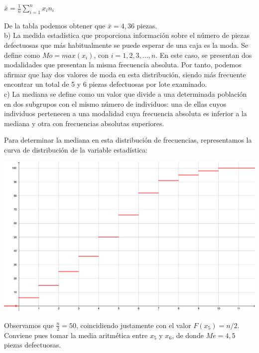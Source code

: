 \begin{center}
	$\bar{x} = \frac{1}{n} \sum_{i=1}^{n}x_{i} n_{i}$ 
\end{center}

De la tabla podemos obtener que $\bar{x} = 4,36$ piezas. \\

b) La medida estadística que proporciona información sobre el número de piezas defectuosas que más habitualmente se puede esperar de una caja es la moda. Se define como $Mo = max(x_{i})$, con $i=1,2,3,...,n$. En este caso, se presentan dos modalidades que presentan la misma frecuencia absoluta. Por tanto, podemos afirmar que hay dos valores de moda en esta distribución, siendo más frecuente encontrar un total de 5 y 6 piezas defectuosas por lote examinado. \\

c) La mediana se define como un valor que divide a una determinada población en dos subgrupos con el mismo número de individuos: una de ellas cuyos individuos pertenecen a una modalidad cuya frecuencia absoluta es inferior a la mediana y otra con frecuencias absolutas superiores.

Para determinar la mediana en esta distribución de frecuencias, representamos la curva de distribución de la variable estadística: 

\begin{center}
	\includegraphics[scale=.35]{ejercicio-4-grafica.pdf}
\end{center}

Observamos que $\frac{n}{2} = 50$, coincidiendo justamente con el valor $F(x_{5}) = n/2$. Conviene pues tomar la media aritmética entre $x_{5}$ y $x_{6}$, de donde $Me = 4,5$ piezas defectuosas.

